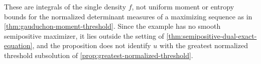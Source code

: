 These are integrals of the single density $f$, not uniform moment or entropy bounds for the normalized determinant measures of a maximizing sequence as in \cref{thm:gauduchon-moment-threshold}. Since the example has no smooth semipositive maximizer, it lies outside the setting of \cref{thm:semipositive-dual-exact-equation}, and the proposition does not identify $u$ with the greatest normalized threshold subsolution of \cref{prop:greatest-normalized-threshold}.
